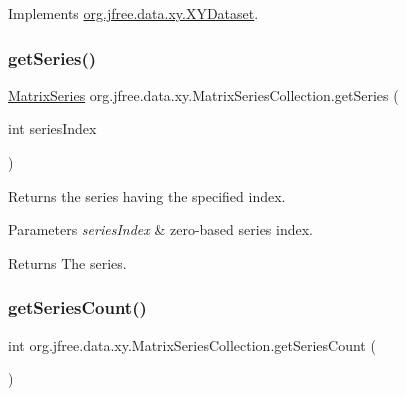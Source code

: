 Implements \mbox{\hyperlink{interfaceorg_1_1jfree_1_1data_1_1xy_1_1_x_y_dataset_ae81f9de91dfcae45028fc8a486a119da}{org.\+jfree.\+data.\+xy.\+X\+Y\+Dataset}}.

\mbox{\label{classorg_1_1jfree_1_1data_1_1xy_1_1_matrix_series_collection_a6c19adfce1496e755a01302df102a62f}} 
\subsubsection{\texorpdfstring{get\+Series()}{getSeries()}}
{\footnotesize\ttfamily \mbox{\hyperlink{classorg_1_1jfree_1_1data_1_1xy_1_1_matrix_series}{Matrix\+Series}} org.\+jfree.\+data.\+xy.\+Matrix\+Series\+Collection.\+get\+Series (\begin{DoxyParamCaption}\item[{int}]{series\+Index }\end{DoxyParamCaption})}

Returns the series having the specified index.


\begin{DoxyParams}{Parameters}
{\em series\+Index} & zero-\/based series index.\\
\hline
\end{DoxyParams}
\begin{DoxyReturn}{Returns}
The series. 
\end{DoxyReturn}
\mbox{\label{classorg_1_1jfree_1_1data_1_1xy_1_1_matrix_series_collection_a1020cb6d922bf7448263b04f3764efe3}} 
\subsubsection{\texorpdfstring{get\+Series\+Count()}{getSeriesCount()}}
{\footnotesize\ttfamily int org.\+jfree.\+data.\+xy.\+Matrix\+Series\+Collection.\+get\+Series\+Count (\begin{DoxyParamCaption}{ }\end{DoxyParamCaption})}

